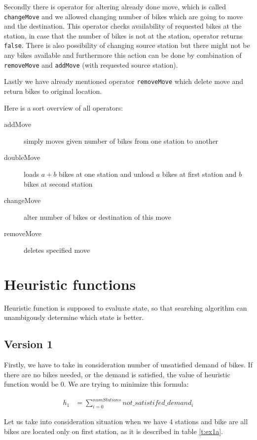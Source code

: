 \documentclass[11pt,twoside,a4paper]{mr}%
\begin{document}
Secondly there is operator for altering already done move, which is called \texttt{changeMove} and we allowed changing number of bikes which are going to move and the destination. This operator checks availability of requested bikes at the station, in case that the number of bikes is not at the station, operator returns \texttt{false}. There is also possibility of changing source station but there might not be any bikes available and furthermore this action can be done by combination of \texttt{removeMove} and \texttt{addMove} (with requested source station).

Lastly we have already mentioned operator \texttt{removeMove} which delete move and return bikes to original location.

Here is a sort overview of all operators:
\begin{description}
 \item[addMove] simply moves given number of bikes from one station to another
\item[doubleMove] loads \( a + b \) bikes at one station and unload \(a\) bikes at first station and \(b\) bikes at second station
\item[changeMove] alter number of bikes or destination of this move
\item[removeMove] deletes specified move
 \end{description}

\section{Heuristic functions}
Heuristic function is supposed to evaluate state, so that searching algorithm can unambigously determine which state is better. 

\subsection{Version 1}
Firstly, we have to take in consideration number of unsatisfied demand of bikes. If there are no bikes needed, or the demand is satisfied, the value of heuristic function would be 0. We are trying to minimize this formula: 

\begin{align}
 h_1 &=\sum\limits_{i=0}^{numStations} not\_satistifed\_demand_i
\end{align}

Let us take into consideration situation when we have 4 stations and bike are all bikes are located only on first station, as it is described in table \ref{t:ex1a}.
\end{document}
